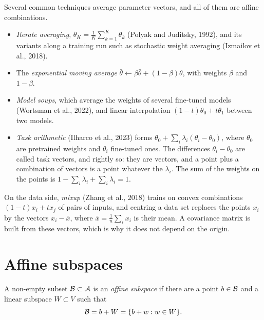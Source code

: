 \begin{notechapter}
\begin{mlthread}
Several common techniques average parameter vectors, and all of them are
affine combinations.
\begin{itemize}[nosep]
  \item \emph{Iterate averaging}, $\bar\theta_K = \frac1K\sum_{k=1}^K\theta_k$
        (Polyak and Juditsky, 1992), and its variants along a training run
        such as stochastic weight averaging (Izmailov et al., 2018).
  \item The \emph{exponential moving average}
        $\bar\theta\leftarrow\beta\bar\theta + (1 - \beta)\theta$, with
        weights $\beta$ and $1 - \beta$.
  \item \emph{Model soups}, which average the weights of several fine-tuned
        models (Wortsman et al., 2022), and linear interpolation
        $(1 - t)\theta_0 + t\theta_1$ between two models.
  \item \emph{Task arithmetic} (Ilharco et al., 2023) forms
        $\theta_0 + \sum_i\lambda_i(\theta_i - \theta_0)$, where $\theta_0$
        are pretrained weights and $\theta_i$ fine-tuned ones. The
        differences $\theta_i - \theta_0$ are called task vectors, and
        rightly so: they are vectors, and a point plus a combination of
        vectors is a point whatever the $\lambda_i$. The sum of the weights
        on the points is $1 - \sum_i\lambda_i + \sum_i\lambda_i = 1$.
\end{itemize}
On the data side, \emph{mixup} (Zhang et al., 2018) trains on convex
combinations $(1 - t)x_i + tx_j$ of pairs of inputs, and centring a data
set replaces the points $x_i$ by the vectors $x_i - \bar x$, where
$\bar x = \frac1n\sum_ix_i$ is their mean. A covariance matrix is built
from these vectors, which is why it does not depend on the origin.
\end{mlthread}

\section{Affine subspaces}\label{affine-spaces:sec:subspaces}

\begin{definition}\label{affine-spaces:def:subspace}
A non-empty subset $\mathcal{B}\subset\mathcal{A}$ is an \emph{affine subspace} if there
are a point $b\in\mathcal{B}$ and a linear subspace $W\subset V$ such that
\[
  \mathcal{B} = b + W = \{b + w : w\in W\} .
\]
\end{definition}


\end{notechapter}
